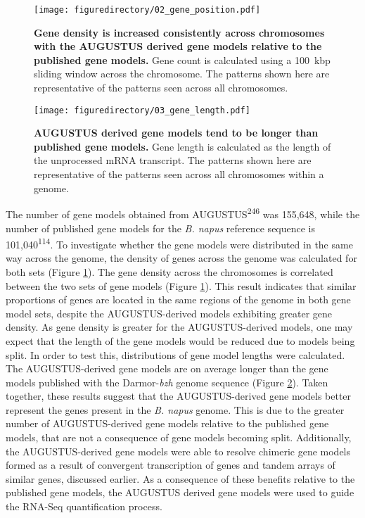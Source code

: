 \documentclass[12pt,]{book}
\begin{document}
\begin{figure}[htbp]
\centering
\texttt{[image: figuredirectory/02\_gene\_position.pdf]}
\caption{\textbf{Gene density is increased consistently across
chromosomes with the AUGUSTUS derived gene models relative to the
published gene models.} Gene count is calculated using a 100~kbp sliding
window across the chromosome. The patterns shown here are representative
of the patterns seen across all
chromosomes.}\label{figure:202:geneposition}
\end{figure}

\begin{figure}[htbp]
\centering
\texttt{[image: figuredirectory/03\_gene\_length.pdf]}
\caption{\textbf{AUGUSTUS derived gene models tend to be longer than
published gene models.} Gene length is calculated as the length of the
unprocessed mRNA transcript. The patterns shown here are representative
of the patterns seen across all chromosomes within a
genome.}\label{figure:203:genelength}
\end{figure}

The number of gene models obtained from AUGUSTUS\textsuperscript{246}
was 155,648, while the number of published gene models for the \emph{B.
napus} reference sequence is 101,040\textsuperscript{114}. To
investigate whether the gene models were distributed in the same way
across the genome, the density of genes across the genome was calculated
for both sets (Figure \ref{figure:202:geneposition}). The gene density
across the chromosomes is correlated between the two sets of gene models
(Figure \ref{figure:202:geneposition}). This result indicates that
similar proportions of genes are located in the same regions of the
genome in both gene model sets, despite the AUGUSTUS-derived models
exhibiting greater gene density. As gene density is greater for the
AUGUSTUS-derived models, one may expect that the length of the gene
models would be reduced due to models being split. In order to test
this, distributions of gene model lengths were calculated. The
AUGUSTUS-derived gene models are on average longer than the gene models
published with the Darmor-\emph{bzh} genome sequence (Figure
\ref{figure:203:genelength}). Taken together, these results suggest that
the AUGUSTUS-derived gene models better represent the genes present in
the \emph{B. napus} genome. This is due to the greater number of
AUGUSTUS-derived gene models relative to the published gene models, that
are not a consequence of gene models becoming split. Additionally, the
AUGUSTUS-derived gene models were able to resolve chimeric gene models
formed as a result of convergent transcription of genes and tandem
arrays of similar genes, discussed earlier. As a consequence of these
benefits relative to the published gene models, the AUGUSTUS derived
gene models were used to guide the RNA-Seq quantification process.
\end{document}
